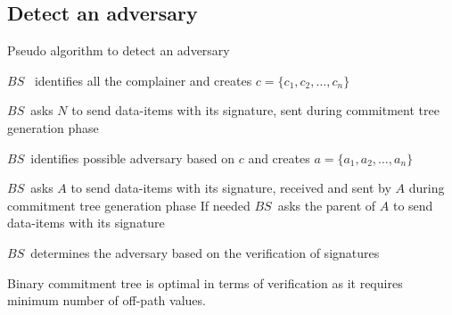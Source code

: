 	\subsection{Detect an adversary}
		\begin{algorithm}
		\caption{Pseudo algorithm to detect an adversary}
		\label{algo:detect-an-adversary}

			\begin{algorithmic}[1]

					\STATE $BS$ \ identifies all the complainer and creates $c = \{c_{1}, c_{2}, \dotsc, c_{n}\}$

						\STATE $BS$\ asks $N$ to send data-items with its signature, sent during commitment tree generation phase
					
					\ENDFOR

					\STATE $BS$\ identifies possible adversary based on $c$ and creates $a = \{a_{1},a_{2},\dotsc,a_{n}\}$


						\STATE $BS$\ asks $A$ to send data-items with its signature, received and sent by $A$ during commitment tree generation phase
						\STATE If needed $BS$\  asks the parent of $A$ to send data-items with its signature
			
					\ENDFOR

					\STATE $BS$\ determines the adversary based on the verification of signatures

			\end{algorithmic}
		\end{algorithm}

	\begin{theorem}
		\label{Commitment tree}
		Binary commitment tree is optimal in terms of verification as it requires minimum number of off-path values.
	\end{theorem}

